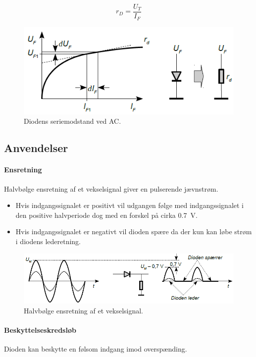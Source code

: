\documentclass[danish]{article}
\begin{document}
\begin{equation}
r_D = \dfrac{U_T}{I_F}
\end{equation}

\begin{figure} [H]
	\centering
	\includegraphics[width=0.9\linewidth]{graphics/ACdiode}
	\caption{Diodens seriemodstand ved AC.}
	\label{fig:AC_diode}
\end{figure}

\subsection{Anvendelser}
\paragraph{Ensretning} Halvbølge ensretning af et vekselsignal giver en pulserende jævnstrøm.

\begin{itemize}
	\item Hvis indgangssignalet er positivt vil udgangen følge med indgangssignalet i den positive halvperiode dog med en forskel på cirka \SI{0,7}{\volt}.
	\item Hvis indgangssignalet er negativt vil dioden spære da der kun kan løbe strøm i diodens lederetning.
\end{itemize}

\begin{figure} [H]
	\centering
	\includegraphics[width=\linewidth]{graphics/ensretning}
	\caption{Halvbølge ensretning af et vekselsignal.}
	\label{fig:ensretning}
\end{figure}

\paragraph{Beskyttelseskredsløb} Dioden kan beskytte en følsom indgang imod overspænding.
\end{document}
